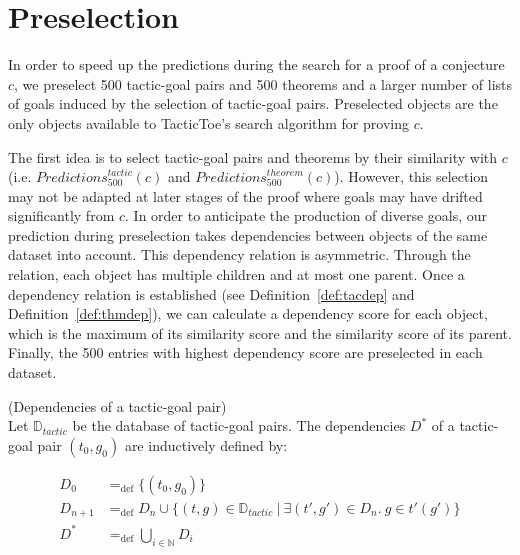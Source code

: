 \documentclass[runningheads,a4paper,draft]{svjour3}
\def\tactictoe{\textsf{TacticToe}\xspace}
\begin{document}
\section{Preselection}\label{sec:presel}

In order to speed up the predictions during the search for a proof of a
conjecture $c$, we preselect 500 tactic-goal pairs and 500 theorems and a
larger number of lists of goals induced by the selection of tactic-goal pairs.
Preselected objects are the only objects available to \tactictoe's search
algorithm for proving $c$.


The first idea is to select tactic-goal pairs and theorems by their similarity
with $c$ (i.e. $\mathit{Predictions}^{\mathit{tactic}}_{500} (c)$ and
$\mathit{Predictions}^{\mathit{theorem}}_{500} (c)$).
However, this selection may not be adapted at later stages of
the proof where goals may have drifted significantly from $c$. In order to
anticipate the production of diverse goals, our prediction during preselection
takes dependencies between objects of the same dataset into account.
This dependency relation is asymmetric. Through the relation, each object has
multiple children and at most one parent.
Once a dependency relation is established (see Definition~\ref{def:tacdep} and 
Definition~\ref{def:thmdep}), we can calculate a dependency score
for each object, which is the maximum of its similarity score
and the similarity score of its parent. Finally, the 500 entries with
highest dependency score are preselected in each dataset.

\begin{definition}\label{def:tacdep}(Dependencies of a tactic-goal pair)\\
Let $\mathbb{D}_{\mathit{tactic}}$ be the database of tactic-goal pairs.
The dependencies $D^*$ of a tactic-goal pair $(t_0,g_0)$ are
inductively defined by:

\begin{align*}
D_0 &=_{\mathrm{def}} \lbrace (t_0,g_0) \rbrace \\
D_{n+1} &=_{\mathrm{def}} D_n \cup \lbrace (t,g)\in 
\mathbb{D}_{\mathit{tactic}}\  |\ \exists
(t',g') \in D_n.\ g \in t'(g') \rbrace  \\
D^* &=_{\mathrm{def}} \bigcup_{i \in \mathbb{N}} D_i\\
\end{align*}
\end{definition}
\end{document}
